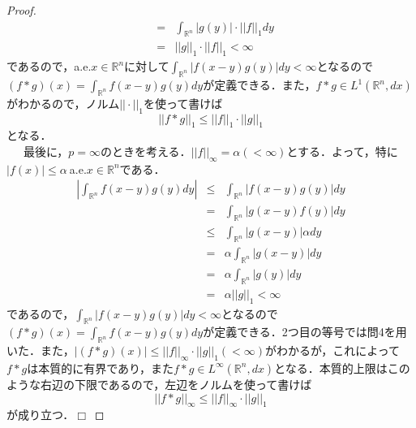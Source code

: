 \documentclass[a4paper,11pt]{jsarticle}
\newtheorem{proof}{証明}
\def\qed{\hfill $\Box$}
\begin{document}
\begin{proof}
\begin{eqnarray*}
&=&\int_{\mathbb{R}^n}|g(y)|\cdot ||f||_1 dy \\
&=&||g||_1\cdot ||f||_1<\infty
\end{eqnarray*}
であるので，a.e.$x\in\mathbb{R}^n$に対して$\int_{\mathbb{R}^n}|f(x-y)g(y)| dy<\infty$となるので$(f\ast g)(x)=\int_{\mathbb{R}^n}f(x-y)g(y)dy$が定義できる．また，$f\ast g\in L^1(\mathbb{R}^n,dx)$がわかるので，ノルム$||\cdot||_1$を使って書けば
\begin{equation*}
||f\ast g||_1\leq ||f||_1\cdot ||g||_1
\end{equation*}
となる．\\
{\ }{\ }{\ }最後に，$p=\infty$のときを考える．$||f||_\infty=\alpha(<\infty)$とする．よって，特に$|f(x)|\leq\alpha{\ }$a.e.$x\in\mathbb{R}^n$である．
\begin{eqnarray*}
\left|\int_{\mathbb{R}^n}f(x-y)g(y)dy\right|&\leq&\int_{\mathbb{R}^n}|f(x-y)g(y)|dy \\
&=&\int_{\mathbb{R}^n}|g(x-y)f(y)|dy \\
&\leq&\int_{\mathbb{R}^n}|g(x-y)|\alpha dy \\
&=&\alpha\int_{\mathbb{R}^n}|g(x-y)|dy \\
&=&\alpha\int_{\mathbb{R}^n}|g(y)|dy \\
&=&\alpha||g||_1<\infty
\end{eqnarray*}
であるので，$\int_{\mathbb{R}^n}|f(x-y)g(y)| dy<\infty$となるので$(f\ast g)(x)=\int_{\mathbb{R}^n}f(x-y)g(y)dy$が定義できる．2つ目の等号では問4を用いた．また，$|(f\ast g)(x)|\leq ||f||_\infty\cdot ||g||_1(<\infty)$がわかるが，これによって$f\ast g$は本質的に有界であり，また$f\ast g\in L^\infty(\mathbb{R}^n,dx)$となる．本質的上限はこのような右辺の下限であるので，左辺をノルムを使って書けば
\begin{equation*}
||f\ast g||_\infty\leq ||f||_\infty\cdot ||g||_1
\end{equation*}
が成り立つ．\qed
\end{proof}
%
%
%
%
\end{document}
